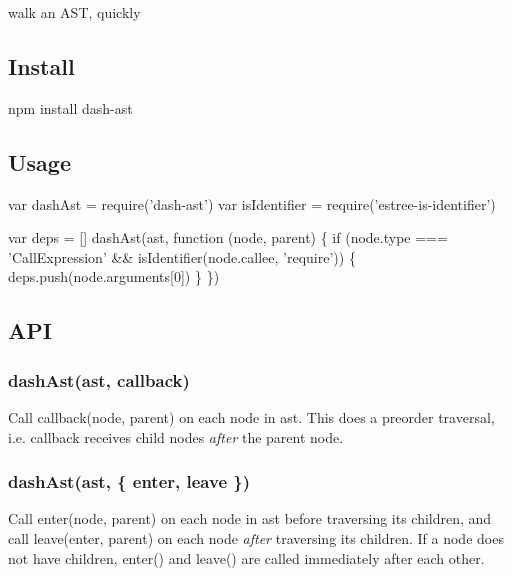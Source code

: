 walk an A\+ST, quickly

\href{https://www.npmjs.com/package/dash-ast}{\tt } \href{https://travis-ci.org/goto-bus-stop/dash-ast}{\tt } \href{http://npm.im/standard}{\tt }

\subsection*{Install}


\begin{DoxyCode}
npm install dash-ast
\end{DoxyCode}


\subsection*{Usage}


\begin{DoxyCode}
var dashAst = require('dash-ast')
var isIdentifier = require('estree-is-identifier')

var deps = []
dashAst(ast, function (node, parent) \{
  if (node.type === 'CallExpression' && isIdentifier(node.callee, 'require')) \{
    deps.push(node.arguments[0])
  \}
\})
\end{DoxyCode}


\subsection*{A\+PI}

\subsubsection*{{\ttfamily dash\+Ast(ast, callback)}}

Call {\ttfamily callback(node, parent)} on each node in {\ttfamily ast}. This does a preorder traversal, i.\+e. {\ttfamily callback} receives child nodes {\itshape after} the parent node.

\subsubsection*{{\ttfamily dash\+Ast(ast, \{ enter, leave \})}}

Call {\ttfamily enter(node, parent)} on each node in {\ttfamily ast} before traversing its children, and call {\ttfamily leave(enter, parent)} on each node {\itshape after} traversing its children. If a node does not have children, {\ttfamily enter()} and {\ttfamily leave()} are called immediately after each other.

